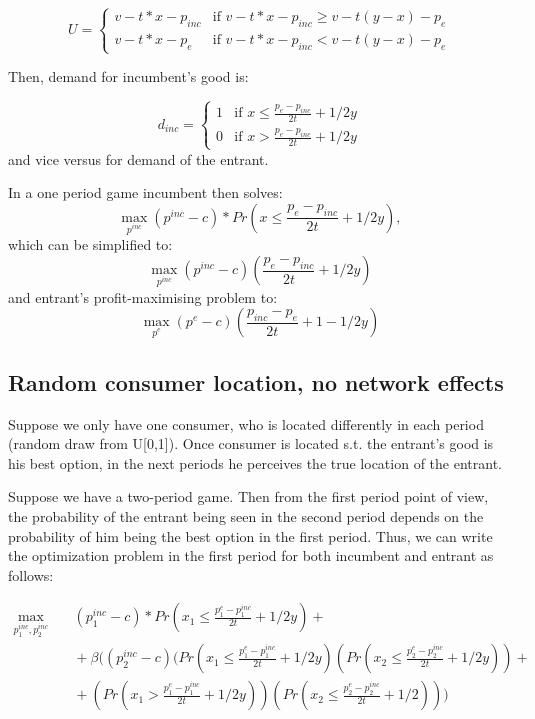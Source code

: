 \documentclass{article}
\begin{document}
    $$ U = \begin{cases}
    v - t*x - p_{inc} &  \text{if } v-t*x - p_{inc} \geq v - t(y-x) - p_{e}\\
    v - t*x - p_{e} &  \text{if } v-t*x - p_{inc} < v - t(y-x) - p_{e}
    \end{cases}
$$

Then, demand for incumbent's good is:

$$d_{inc} = \begin{cases}
    1 &  \text{if } x \leq \frac{p_{e}-p_{inc}}{2t} + 1/2y\\
    0 &  \text{if } x > \frac{p_{e}-p_{inc}}{2t} + 1/2y
    \end{cases}
$$
 and vice versus for demand of the entrant.
 
In a one period game incumbent then solves:
$$\max_{p^{inc}} (p^{inc}-c)* Pr(x \leq \frac{p_{e}-p_{inc}}{2t} + 1/2y),$$
which can be simplified to:
$$\max_{p^{inc}} (p^{inc}-c)(\frac{p_{e}-p_{inc}}{2t} + 1/2y)$$
and entrant's profit-maximising problem to:
$$\max_{p^{e}} (p^{e}-c)(\frac{p_{inc}-p_{e}}{2t} + 1 - 1/2y)$$

\subsection{Random consumer location, no network effects}
    
    Suppose we only have one consumer, who is located differently in each period (random draw from U[0,1]). Once consumer is located s.t. the entrant's good is his best option, in the next periods he perceives the true location of the entrant.
    
    Suppose we have a two-period game. Then from the first period point of view, the probability of the entrant being seen in the second period depends on the probability of him being the best option in the first period. Thus, we can write the optimization problem in the first period for both incumbent and entrant as follows:
    
    $$ \begin{aligned}
    \max_{p^{inc}_1, p^{inc}_2} {}
    & \quad (p^{inc}_1-c)* Pr(x_1 \leq \frac{p^{e}_1-p^{inc}_1}{2t} + 1/2y) + \\
    & \quad + \beta((p^{inc}_2-c)(Pr(x_1 \leq \frac{p^{e}_1-p^{inc}_1}{2t} + 1/2y)(Pr(x_2 \leq \frac{p^{e}_2-p^{inc}_2}{2t} + 1/2y)) + \\
    & \quad + (Pr(x_1 > \frac{p^{e}_1-p^{inc}_1}{2t} + 1/2y))(Pr(x_2 \leq \frac{p^{e}_2-p^{inc}_2}{2t} + 1/2)))
    \end{aligned}
    $$
\end{document}
